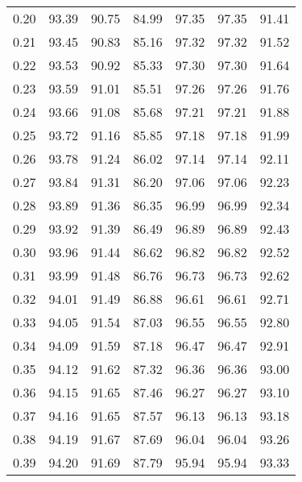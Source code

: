 \begin{tabular}{|c|c|c|c|c|c|c|}
      0.20 &     93.39 &     90.75 &      84.99 &   97.35 &      97.35 &         91.41 \\
      0.21 &     93.45 &     90.83 &      85.16 &   97.32 &      97.32 &         91.52 \\
      0.22 &     93.53 &     90.92 &      85.33 &   97.30 &      97.30 &         91.64 \\
      0.23 &     93.59 &     91.01 &      85.51 &   97.26 &      97.26 &         91.76 \\
      0.24 &     93.66 &     91.08 &      85.68 &   97.21 &      97.21 &         91.88 \\
      0.25 &     93.72 &     91.16 &      85.85 &   97.18 &      97.18 &         91.99 \\
      0.26 &     93.78 &     91.24 &      86.02 &   97.14 &      97.14 &         92.11 \\
      0.27 &     93.84 &     91.31 &      86.20 &   97.06 &      97.06 &         92.23 \\
      0.28 &     93.89 &     91.36 &      86.35 &   96.99 &      96.99 &         92.34 \\
      0.29 &     93.92 &     91.39 &      86.49 &   96.89 &      96.89 &         92.43 \\
      0.30 &     93.96 &     91.44 &      86.62 &   96.82 &      96.82 &         92.52 \\
      0.31 &     93.99 &     91.48 &      86.76 &   96.73 &      96.73 &         92.62 \\
      0.32 &     94.01 &     91.49 &      86.88 &   96.61 &      96.61 &         92.71 \\
      0.33 &     94.05 &     91.54 &      87.03 &   96.55 &      96.55 &         92.80 \\
      0.34 &     94.09 &     91.59 &      87.18 &   96.47 &      96.47 &         92.91 \\
      0.35 &     94.12 &     91.62 &      87.32 &   96.36 &      96.36 &         93.00 \\
      0.36 &     94.15 &     91.65 &      87.46 &   96.27 &      96.27 &         93.10 \\
      0.37 &     94.16 &     91.65 &      87.57 &   96.13 &      96.13 &         93.18 \\
      0.38 &     94.19 &     91.67 &      87.69 &   96.04 &      96.04 &         93.26 \\
      0.39 &     94.20 &     91.69 &      87.79 &   95.94 &      95.94 &         93.33 \\

\end{tabular}
